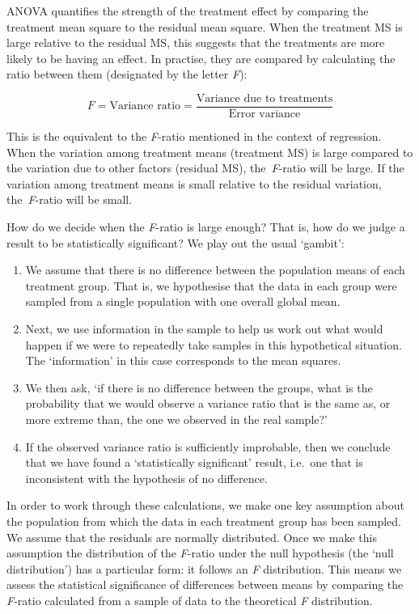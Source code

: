 \documentclass[
]{book}
\begin{document}
ANOVA quantifies the strength of the treatment effect by comparing the treatment mean square to the residual mean square. When the treatment MS is large relative to the residual MS, this suggests that the treatments are more likely to be having an effect. In practise, they are compared by calculating the ratio between them (designated by the letter \emph{F}):

\[F = \mbox{Variance ratio} = \frac{\mbox{Variance due to treatments}}{\mbox{Error variance}}\]

This is the equivalent to the \emph{F}-ratio mentioned in the context of regression. When the variation among treatment means (treatment MS) is large compared to the variation due to other factors (residual MS), the~\emph{F}-ratio will be large. If the variation among treatment means is small relative to the residual variation, the~\emph{F}-ratio will be small.

How do we decide when the \emph{F}-ratio is large enough? That is, how do we judge a result to be statistically significant? We play out the usual `gambit':

\begin{enumerate}
\def\labelenumi{\arabic{enumi}.}
\item
  We assume that there is no difference between the population means of each treatment group. That is, we hypothesise that the data in each group were sampled from a single population with one overall global mean.
\item
  Next, we use information in the sample to help us work out what would happen if we were to repeatedly take samples in this hypothetical situation. The `information' in this case corresponds to the mean squares.
\item
  We then ask, `if there is no difference between the groups, what is the probability that we would observe a variance ratio that is the same as, or more extreme than, the one we observed in the real sample?'
\item
  If the observed variance ratio is sufficiently improbable, then we conclude that we have found a `statistically significant' result, i.e.~one that is inconsistent with the hypothesis of no difference.
\end{enumerate}

In order to work through these calculations, we make one key assumption about the population from which the data in each treatment group has been sampled. We assume that the residuals are normally distributed. Once we make this assumption the distribution of the \emph{F}-ratio under the null hypothesis (the `null distribution') has a particular form: it follows an \emph{F} distribution. This means we assess the statistical significance of differences between means by comparing the \emph{F}-ratio calculated from a sample of data to the theoretical \emph{F} distribution.
\end{document}
